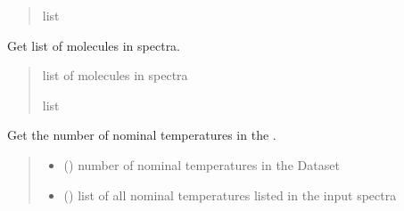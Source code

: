 \documentclass[letterpaper,10pt,english]{sphinxmanual}
\begin{document}
\begin{fulllineitems}
\begin{fulllineitems}
\begin{quote}
\begin{description}
\sphinxAtStartPar
list

\end{description}\end{quote}

\end{fulllineitems}


\begin{fulllineitems}
\label{\detokenize{MATS:MATS.dataset.Dataset.get_molecules}}
\pysigstartsignatures
{}
\pysigstopsignatures
\sphinxAtStartPar
Get list of molecules in spectra.
\begin{quote}\begin{description}
\sphinxAtStartPar
{} \textendash{} list of molecules in spectra

\sphinxAtStartPar
list

\end{description}\end{quote}

\end{fulllineitems}


\begin{fulllineitems}
\label{\detokenize{MATS:MATS.dataset.Dataset.get_number_nominal_temperatures}}
\pysigstartsignatures
{}
\pysigstopsignatures
\sphinxAtStartPar
Get the number of nominal temperatures in the .
\begin{quote}\begin{description}
\sphinxAtStartPar
\begin{itemize}
\item {} 
\sphinxAtStartPar
{} () \textendash{} number of nominal temperatures in the Dataset

\item {} 
\sphinxAtStartPar
{} () \textendash{} list of all nominal temperatures listed in the input spectra


\end{itemize}
\end{description}
\end{quote}
\end{fulllineitems}
\end{fulllineitems}
\end{document}
